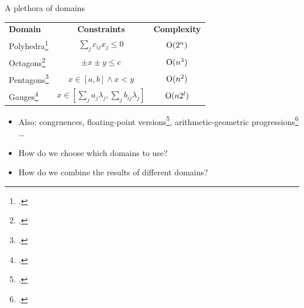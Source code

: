 \documentclass[aspectratio=169,notes]{beamer}
\begin{document}
\begin{frame}{A plethora of domains}
  \footnotesize
  \begin{tightcenter}
  \begin{tabular}{lcc}
    \textbf{Domain} & \textbf{Constraints} & \textbf{Complexity} \\
    Polyhedra\footcite{cousot1978automatic} & \( \sum_{j} c_{ij}x_j \leq 0 \) & $ \operatorname{O}(2^n) $ \\
    Octagons\footcite{mine2004weakly} & \( \pm x \pm y \leq c \) & $ \operatorname{O}(n^3) $ \\
    Pentagons\footcite{logozzo2010pentagons} & \( x \in [a,b] \wedge x < y \) & $ \operatorname{O}(n^2) $ \\
    Gauges\footcite{venet2012gauge} & \( x \in \left[\sum_{j} a_{j}\lambda_j, \sum_{j} b_{ij}\lambda_j \right] \) & $ \operatorname{O}(n2^l) $ \\
  \end{tabular}
  \end{tightcenter}
  \begin{itemize}[<+->]
  \item Also: congruences, floating-point versions\footcite{mine2004relational}, arithmetic-geometric progressions\footcite{feret2005arithmetic} \ldots{}
  \item How do we choose which domains to use?
  \item How do we combine the results of different domains?
  \end{itemize}

  \vspace*{1em}

\end{frame}
\end{document}

